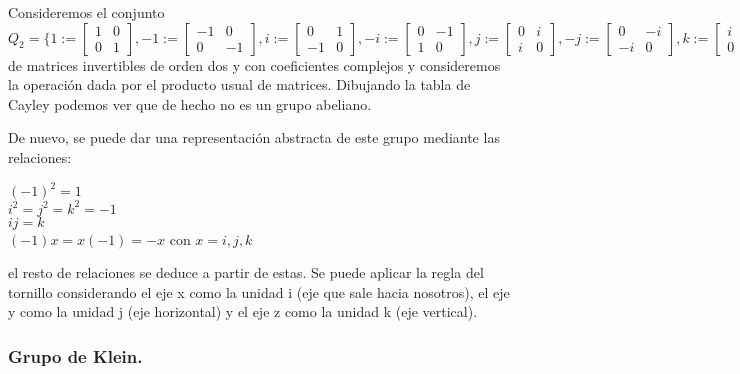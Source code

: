 Consideremos el conjunto 
$Q_2 = \{
1 := \begin{bmatrix}
    1 & 0  \\
    0 & 1 
\end{bmatrix},
-1 := \begin{bmatrix}
    -1 & 0  \\
    0 & -1 
\end{bmatrix},
i := \begin{bmatrix}
    0 & 1  \\
    -1 & 0 
\end{bmatrix},
-i := \begin{bmatrix}
    0 & -1  \\
    1 & 0 
\end{bmatrix},
j := \begin{bmatrix}
    0 & i  \\
    i & 0 
\end{bmatrix},
-j := \begin{bmatrix}
    0 & -i  \\
    -i & 0 
\end{bmatrix},
k := \begin{bmatrix}
    i & 0  \\
    0 & -i 
\end{bmatrix},
-k := \begin{bmatrix}
    -i & 0  \\
    0 & i 
\end{bmatrix} \}$
de matrices invertibles de orden dos y con coeficientes complejos y consideremos la operación dada por el producto usual de matrices. Dibujando la tabla de Cayley podemos ver que de hecho no es un grupo abeliano.

De nuevo, se puede dar una representación abstracta de este grupo mediante las relaciones:

$(-1)^2 = 1$ \\
$i^2 = j^2 = k^2 = -1$ \\
$ij = k$ \\
$(-1)x = x(-1) = -x$ con $x = i,j,k$

el resto de relaciones se deduce a partir de estas. Se puede aplicar la regla del tornillo considerando el eje x como la unidad i (eje que sale hacia nosotros), el eje y como la unidad j (eje horizontal) y el eje z como la unidad k (eje vertical).

\subsubsection{Grupo de Klein.}

